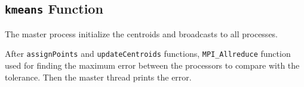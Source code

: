 



\subsection{\texttt{kmeans} Function}
The master process initialize the centroids and broadcasts to all processes.


After \texttt{assignPoints} and \texttt{updateCentroids} functions, \texttt{MPI\_Allreduce} function used for finding the maximum error between the processors to compare with the tolerance. Then the master thread prints the error.



